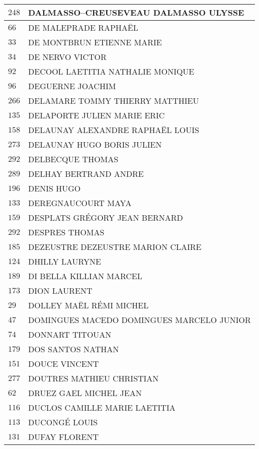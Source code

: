 \begin{xltabular}{\linewidth}{|l|X|}
    $248$ & DALMASSO--CREUSEVEAU DALMASSO ULYSSE \\
    \hline
    $66$ & DE MALEPRADE RAPHAËL \\
    \hline
    $33$ & DE MONTBRUN ETIENNE MARIE \\
    \hline
    $34$ & DE NERVO VICTOR \\
    \hline
    $92$ & DECOOL LAETITIA NATHALIE MONIQUE \\
    \hline
    $96$ & DEGUERNE JOACHIM \\
    \hline
    $266$ & DELAMARE TOMMY THIERRY MATTHIEU \\
    \hline
    $135$ & DELAPORTE JULIEN MARIE ERIC \\
    \hline
    $158$ & DELAUNAY ALEXANDRE RAPHAËL LOUIS \\
    \hline
    $273$ & DELAUNAY HUGO BORIS JULIEN \\
    \hline
    $292$ & DELBECQUE THOMAS \\
    \hline
    $289$ & DELHAY BERTRAND ANDRE \\
    \hline
    $196$ & DENIS HUGO \\
    \hline
    $133$ & DEREGNAUCOURT MAYA \\
    \hline
    $159$ & DESPLATS GRÉGORY JEAN BERNARD \\
    \hline
    $292$ & DESPRES THOMAS \\
    \hline
    $185$ & DEZEUSTRE DEZEUSTRE MARION CLAIRE \\
    \hline
    $124$ & DHILLY LAURYNE \\
    \hline
    $189$ & DI BELLA KILLIAN MARCEL \\
    \hline
    $173$ & DION LAURENT \\
    \hline
    $29$ & DOLLEY MAËL RÉMI MICHEL \\
    \hline
    $47$ & DOMINGUES MACEDO DOMINGUES MARCELO JUNIOR \\
    \hline
    $74$ & DONNART TITOUAN \\
    \hline
    $179$ & DOS SANTOS NATHAN \\
    \hline
    $151$ & DOUCE VINCENT \\
    \hline
    $277$ & DOUTRES MATHIEU CHRISTIAN \\
    \hline
    $62$ & DRUEZ GAEL MICHEL JEAN \\
    \hline
    $116$ & DUCLOS CAMILLE MARIE LAETITIA \\
    \hline
    $113$ & DUCONGÉ LOUIS \\
    \hline
    $131$ & DUFAY FLORENT \\

\end{xltabular}
